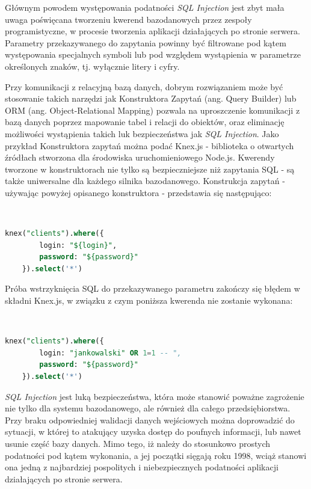 \documentclass[12pt,twoside]{article}
\begin{document}
Głównym powodem występowania podatności \emph{SQL Injection} jest zbyt mała uwaga poświęcana tworzeniu kwerend bazodanowych przez zespoły programistyczne, w procesie tworzenia aplikacji działających po stronie serwera. Parametry przekazywanego do zapytania powinny być filtrowane pod kątem występowania specjalnych symboli lub pod względem wystąpienia w parametrze określonych znaków, tj. wyłącznie litery i cyfry.

Przy komunikacji z relacyjną bazą danych, dobrym rozwiązaniem może być stosowanie takich narzędzi jak Konstruktora Zapytań (ang. Query Builder) lub ORM (ang. Object-Relational Mapping) pozwala na uproszczenie komunikacji z bazą danych poprzez mapowanie tabel i relacji do obiektów, oraz eliminację możliwości wystąpienia takich luk bezpieczeństwa jak \emph{SQL Injection}. Jako przykład Konstruktora zapytań można podać Knex.js - biblioteka o otwartych źródłach stworzona dla środowiska uruchomieniowego Node.js. Kwerendy tworzone w konstruktorach nie tylko są bezpieczniejsze niż zapytania SQL - są także uniwersalne dla każdego silnika bazodanowego. Konstrukcja zapytań - używając powyżej opisanego konstruktora - przedstawia się następująco:

\

\begin{lstlisting}[language=SQL,caption=Kwerenda bazodanowa stworzona przy użyciu konstruktora zapytań Knex.js,label={KodSQL7}]	
	knex("clients").where({
		login: "${login}",
		password: "${password}"
	}).select('*')
\end{lstlisting}	

Próba wstrzyknięcia SQL do przekazywanego parametru zakończy się błędem w składni Knex.js, w związku z czym poniższa kwerenda nie zostanie wykonana:

\

\begin{lstlisting}[language=SQL,caption=Próba wykonania wstrzyknięcia SQL na konstruktorze zapytań Knex.js ,label={KodSQL8}]	
	knex("clients").where({
		login: "jankowalski" OR 1=1 -- ",
		password: "${password}"
	}).select('*')
\end{lstlisting}	

\emph{SQL Injection} jest luką bezpieczeństwa, która może stanowić poważne zagrożenie nie tylko dla systemu bazodanowego, ale również dla całego przedsiębiorstwa. Przy braku odpowiedniej walidacji danych wejściowych można doprowadzić do sytuacji, w której to atakujący uzyska dostęp do poufnych informacji, lub nawet usunie część bazy danych. Mimo tego, iż należy do stosunkowo prostych podatności pod kątem wykonania, a jej początki sięgają roku 1998, wciąż stanowi ona jedną z najbardziej pospolitych i niebezpiecznych podatności aplikacji działających po stronie serwera.
\end{document}
